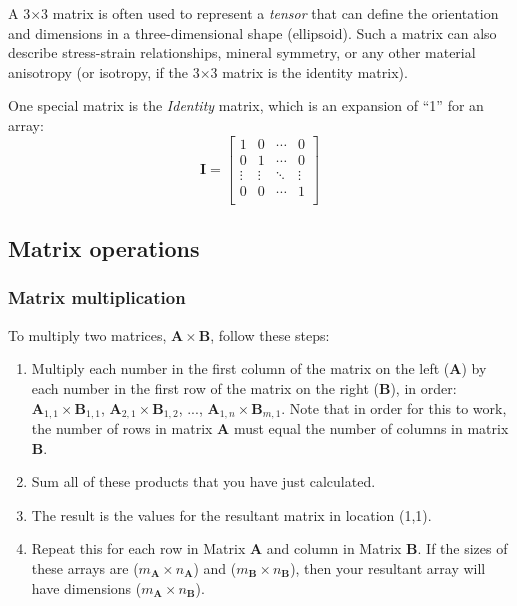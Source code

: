 \documentclass[a4paper,10pt]{scrartcl}
\begin{document}
A 3$\times$3 matrix is often used to represent a \textit{tensor} that can define the orientation and dimensions in a three-dimensional shape (ellipsoid). Such a matrix can also describe stress-strain relationships, mineral symmetry, or any other material anisotropy (or isotropy, if the 3$\times$3 matrix is the identity matrix).

One special matrix is the \emph{Identity} matrix, which is an expansion of ``1'' for an array:
\begin{equation}
\mathbf{I} =
 \begin{bmatrix}
  1 & 0 & \cdots & 0 \\
  0 & 1 & \cdots & 0 \\
  \vdots & \vdots & \ddots & \vdots \\
  0 & 0 & \cdots & 1 \\
 \end{bmatrix}
\end{equation}

\subsection{Matrix operations}

\subsubsection{Matrix multiplication}

To multiply two matrices, $\mathbf{A} \times \mathbf{B}$, follow these steps:
\begin{enumerate}
 \item Multiply each number in the first column of the matrix on the left ($\mathbf{A}$) by each number in the first row of the matrix on the right ($\mathbf{B}$), in order: $\mathbf{A}_{1,1} \times \mathbf{B}_{1,1}$, $\mathbf{A}_{2,1} \times \mathbf{B}_{1,2}$, ..., $\mathbf{A}_{1,n} \times \mathbf{B}_{m,1}$. Note that in order for this to work, the number of rows in matrix $\mathbf{A}$ must equal the number of columns in matrix $\mathbf{B}$.
 \item Sum all of these products that you have just calculated.
 \item The result is the values for the resultant matrix in location (1,1).
 \item Repeat this for each row in Matrix $\mathbf{A}$ and column in Matrix $\mathbf{B}$. If the sizes of these arrays are ($m_\mathbf{A} \times n_\mathbf{A}$) and ($m_\mathbf{B} \times n_\mathbf{B}$), then your resultant array will have dimensions ($m_\mathbf{A} \times n_\mathbf{B}$).
\end{enumerate}
\end{document}
